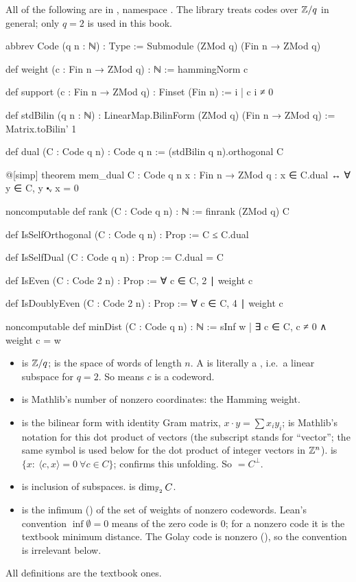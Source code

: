 All of the following are in , namespace
.  The library treats codes over ${\mathbb{Z}}/q$ in general; only $q=2$ is used in this book.
\begin{leancode}
abbrev Code (q n : ℕ) : Type := Submodule (ZMod q) (Fin n → ZMod q)

def weight (c : Fin n → ZMod q) : ℕ := hammingNorm c

def support (c : Fin n → ZMod q) : Finset (Fin n) := {i | c i ≠ 0}

def stdBilin (q n : ℕ) : LinearMap.BilinForm (ZMod q) (Fin n → ZMod q) := Matrix.toBilin' 1

def dual (C : Code q n) : Code q n := (stdBilin q n).orthogonal C

@[simp] theorem mem_dual {C : Code q n} {x : Fin n → ZMod q} :
    x ∈ C.dual ↔ ∀ y ∈ C, y ⬝ᵥ x = 0

noncomputable def rank (C : Code q n) : ℕ := finrank (ZMod q) C

def IsSelfOrthogonal (C : Code q n) : Prop := C ≤ C.dual

def IsSelfDual (C : Code q n) : Prop := C.dual = C

def IsEven (C : Code 2 n) : Prop := ∀ c ∈ C, 2 ∣ weight c

def IsDoublyEven (C : Code 2 n) : Prop := ∀ c ∈ C, 4 ∣ weight c

noncomputable def minDist (C : Code q n) : ℕ := sInf {w | ∃ c ∈ C, c ≠ 0 ∧ weight c = w}
\end{leancode}
\begin{dictionary}
\begin{itemize}
\item {} is ${\mathbb{Z}}/q$;  is the space of words of length $n$.  A
   is literally a , i.e.\ a linear subspace for $q=2$.  So
   means $c$ is a codeword.
\item {} is Mathlib's number of nonzero coordinates: the Hamming weight.
\item {} is the bilinear form with identity Gram matrix, $x\cdot y=\sum
  x_iy_i$;  is Mathlib's notation for this dot product of vectors (the subscript
 stands for ``vector''; the same symbol is used below for the dot product of integer
vectors in ${\mathbb{Z}}^n$).
   is $\{x:\ \langle c,x\rangle=0\ \forall c\in C\}$;  confirms
  this unfolding.  So  $=C^\perp$.
\item {} is inclusion of subspaces.   is $\dim_{\mathbb{F}_2}C$.
\item {} is the infimum () of the set of weights of nonzero codewords.
  Lean's convention $\inf\emptyset=0$ means  of the zero code is $0$; for a nonzero
  code it is the textbook minimum distance.  The Golay code is nonzero
  (), so the convention is irrelevant below.
\end{itemize}
All definitions are the textbook ones.
\end{dictionary}

